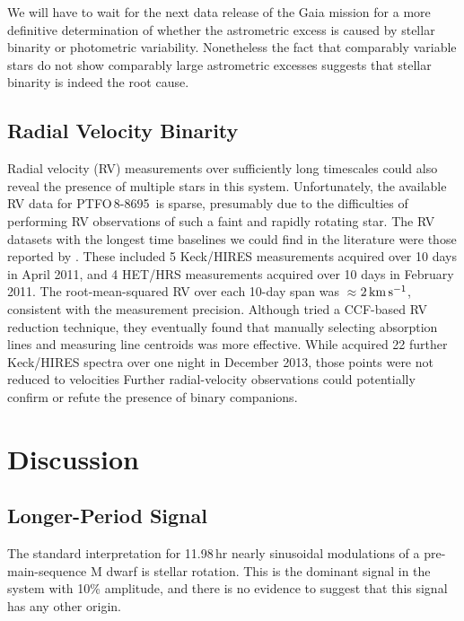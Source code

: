 \documentclass[12pt,twocolumn,tighten]{aastex62}
\newcommand{\ptfo}{PTFO$\,$8-8695}
\begin{document}
We will have to wait for the next data release of the Gaia mission for
a more definitive determination of whether the astrometric excess is
caused by stellar binarity or photometric variability.  Nonetheless
the fact that comparably variable stars do not show comparably large
astrometric excesses suggests that stellar binarity is indeed the root
cause.

\subsection{Radial Velocity Binarity}

Radial velocity (RV) measurements over sufficiently long timescales
could also reveal the presence of multiple stars in this system.
Unfortunately, the available RV data for \ptfo\ is sparse, presumably
due to the difficulties of performing RV observations of such a faint
and rapidly rotating star.  The RV datasets with the longest time
baselines we could find in the literature were those reported by
\citet{van_eyken_ptf_2012}.  These included 5 Keck/HIRES measurements
acquired over 10 days in April 2011, and 4 HET/HRS measurements
acquired over 10 days in February 2011.  The root-mean-squared RV over
each 10-day span was $\approx$$2\,{\rm km}\,{\rm s}^{-1}$, consistent
with the measurement precision.  Although \citet{van_eyken_ptf_2012}
tried a CCF-based RV reduction technique, they eventually found that
manually selecting absorption lines and measuring line centroids was
more effective.  While \citet{yu_tests_2015} acquired 22 further
Keck/HIRES spectra over one night in December 2013, those points were
not reduced to velocities Further radial-velocity observations could
potentially confirm or refute the presence of binary companions.

\section{Discussion}
\label{sec:discussion}

\subsection{Longer-Period Signal}

The standard interpretation for 11.98$\,$hr nearly sinusoidal
modulations of a pre-main-sequence M dwarf is stellar rotation.  This
is the dominant signal in the system with 10\% amplitude, and there is
no evidence to suggest that this signal has any other origin.
\end{document}
